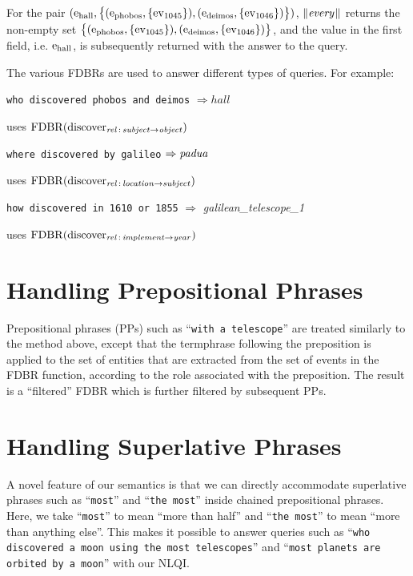 \documentclass[../main.tex]{subfiles}
\begin{document}
\begin{refsection}
For the pair $(\mathrm{e}_{\operatorname{hall}}, \big\{(\mathrm{e}_{\operatorname{phobos}}, \{\operatorname{ev}_{1045}\}), (\mathrm{e}_{\operatorname{deimos}}, \{\operatorname{ev}_{1046}\})\big\})$, $\lVert\textit{every\hspace{0.1em}}\rVert$ returns the non-empty set $\big\{(\mathrm{e}_{\operatorname{phobos}}, \{\operatorname{ev}_{1045}\}), (\mathrm{e}_{\operatorname{deimos}}, \{\operatorname{ev}_{1046}\})\big\}$, and the value in the first field, i.e. $\mathrm{e}_{\operatorname{hall}}$, is subsequently returned with the answer to the query.

The various FDBRs are used to answer different types of queries. For example:

\examplespacing

\texttt{who discovered phobos and deimos} $\Rightarrow hall$

\indent \indent uses $\operatorname{FDBR}({\operatorname{discover}_{\operatorname{\mathit{rel}}\,:\,\operatorname{\mathit{subject}} \rightarrow \operatorname{\mathit{object}}}})$

\texttt{where discovered by galileo} $\Rightarrow \operatorname{\mathit{padua}}$

\indent \indent uses $\operatorname{FDBR}({\operatorname{discover}_{\operatorname{\mathit{rel}}\,:\,\operatorname{\mathit{location}} \rightarrow \operatorname{\mathit{subject}}}})$

\texttt{how discovered in 1610 or 1855} $\Rightarrow$  \textit{galilean\_telescope\_1}

\indent \indent uses $\operatorname{FDBR}({\operatorname{discover}_{\operatorname{\mathit{rel}}\,:\,\operatorname{\mathit{implement}} \rightarrow \operatorname{\mathit{year}}}})$

\section{Handling Prepositional Phrases}
\label{webist2019journal:prep}

Prepositional phrases (PPs) such as ``\texttt{with a telescope}'' are treated
similarly to the method above, except that the termphrase
following the preposition is applied to the set of entities that are extracted from
the set of events in the FDBR function, according to the role associated with
the preposition. The result is a ``filtered'' FDBR which is further filtered by
subsequent PPs.

\section{Handling Superlative Phrases}
\label{webist2019journal:superlatives}

A novel feature of our semantics is that we can directly accommodate superlative phrases such as ``\texttt{most}'' and ``\texttt{the most}'' inside chained prepositional phrases.  Here, we take ``\texttt{most}'' to mean ``more than half'' and ``\texttt{the most}'' to mean ``more than anything else''. This makes it possible to answer queries such as ``\texttt{who discovered a moon using the most telescopes}'' and ``\texttt{most planets are orbited by a moon}'' with our NLQI.


\end{refsection}
\end{document}
